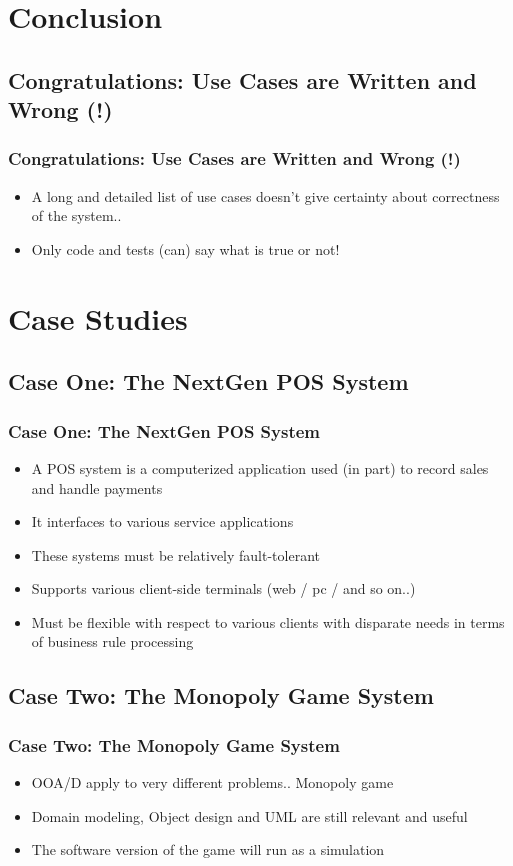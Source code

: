 \documentclass{beamer}
\begin{document}
\section{Conclusion}
\subsection{Congratulations: Use Cases are Written and Wrong (!)}
\begin{frame}
  \frametitle{Congratulations: Use Cases are Written and Wrong (!)}
  \begin{itemize}

	\item<+-> A long and detailed list of use cases doesn't give certainty about correctness of the system.. 
	\item<+-> Only code and tests (can) say what is true or not!
   \end{itemize}
\end{frame}


\section{Case Studies}
\subsection{Case One: The NextGen POS System}
\begin{frame}
  \frametitle{Case One: The NextGen POS System}
  \begin{itemize}
	\item<+-> A POS system is a computerized application used (in part) to record sales and handle payments
	\item<+-> It interfaces to various service applications
	\item<+-> These systems must be relatively fault-tolerant
	\item<+-> Supports various client-side terminals (web / pc / and so on..) 
	\item<+-> Must be flexible with respect to various clients with disparate needs in terms of business rule processing
   \end{itemize}
\end{frame}

\subsection{Case Two: The Monopoly Game System}
\begin{frame}
	\frametitle{Case Two: The Monopoly Game System}
  	\begin{itemize}
	\item<+-> OOA/D apply to very different problems.. Monopoly game
	\item<+-> Domain modeling, Object design and UML are still relevant and useful
	\item<+-> The software version of the game will run as a simulation
   \end{itemize}
\end{frame}
\end{document}
